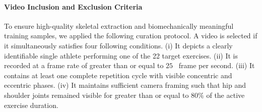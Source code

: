\documentclass[preprint,12pt]{elsarticle}
\begin{document}
\paragraph{Video Inclusion and Exclusion Criteria} 
To ensure high-quality skeletal extraction and biomechanically meaningful training samples, we applied the following curation protocol. 
A video is selected if it simultaneously satisfies four following conditions. (i) It depicts a clearly identifiable single athlete performing one of the 22 target exercises. (ii) It is recorded at a frame rate of greater than or equal to $25$~ frame per second. (iii) It contains at least one complete repetition cycle with visible concentric and eccentric phases. (iv) It maintains sufficient camera framing such that hip and shoulder joints remained visible for greater than or equal to $80\%$ of the active exercise duration.
\end{document}
